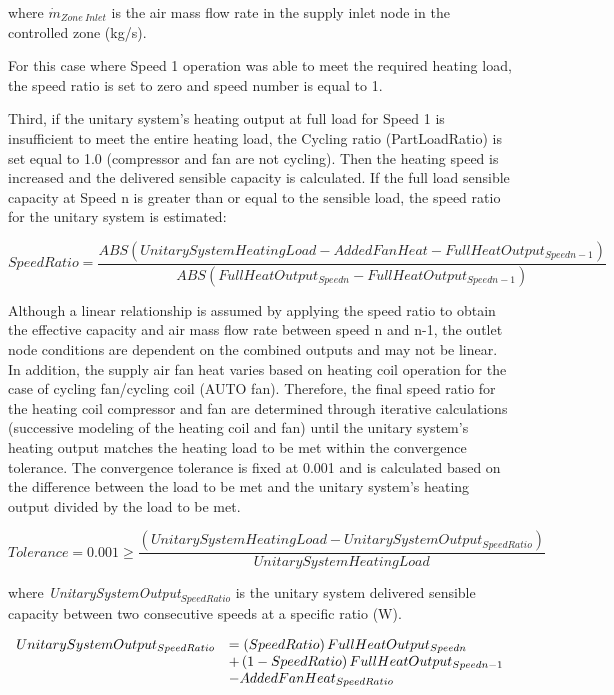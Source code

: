 where \({\dot m_{Zone~Inlet}}\) is the air mass flow rate in the supply inlet node in the controlled zone (kg/s).

For this case where Speed 1 operation was able to meet the required heating load, the speed ratio is set to zero and speed number is equal to 1.

Third, if the unitary system's heating output at full load for Speed 1 is insufficient to meet the entire heating load, the Cycling ratio (PartLoadRatio) is set equal to 1.0 (compressor and fan are not cycling). Then the heating speed is increased and the delivered sensible capacity is calculated. If the full load sensible capacity at Speed n is greater than or equal to the sensible load, the speed ratio for the unitary system is estimated:

\begin{equation}
SpeedRatio = \frac{{ABS\left( {UnitarySystemHeatingLoad - AddedFanHeat - FullHeatOutpu{t_{Speedn - 1}}} \right)}}{{ABS\left( {FullHeatOutpu{t_{Speedn}} - FullHeatOutpu{t_{Speedn - 1}}} \right)}}
\end{equation}

Although a linear relationship is assumed by applying the speed ratio to obtain the effective capacity and air mass flow rate between speed n and n-1, the outlet node conditions are dependent on the combined outputs and may not be linear. In addition, the supply air fan heat varies based on heating coil operation for the case of cycling fan/cycling coil (AUTO fan). Therefore, the final speed ratio for the heating coil compressor and fan are determined through iterative calculations (successive modeling of the heating coil and fan) until the unitary system's heating output matches the heating load to be met within the convergence tolerance. The convergence tolerance is fixed at 0.001 and is calculated based on the difference between the load to be met and the unitary system's heating output divided by the load to be met.

\begin{equation}
Tolerance = 0.001 \ge \frac{{\left( {UnitarySystemHeatingLoad - UnitarySystemOutpu{t_{SpeedRatio}}} \right)}}{{UnitarySystemHeatingLoad}}
\end{equation}

where \emph{UnitarySystemOutput\(_{SpeedRatio}\)} is the unitary system delivered sensible capacity between two consecutive speeds at a specific ratio (W).

\begin{equation}
  \begin{array}{rl}
    UnitarySystemOutput_{SpeedRatio} &= \left(SpeedRatio\right) FullHeatOutput_{Speedn} \\
                                     &+ \left(1 - SpeedRatio\right) FullHeatOutput_{Speedn-1} \\
                                     &- AddedFanHeat_{SpeedRatio}
  \end{array}
\end{equation}

